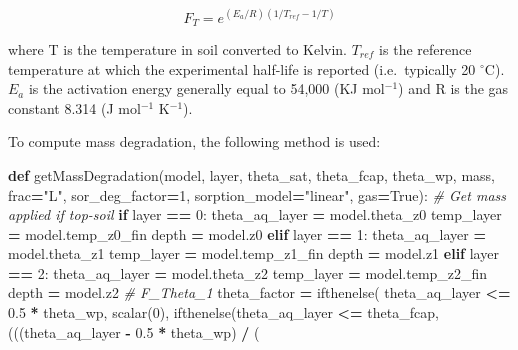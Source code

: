 \documentclass[]{article}
\newenvironment{Shaded}{\begin{snugshade}}{\end{snugshade}}
\newcommand{\KeywordTok}[1]{\textcolor[rgb]{0.13,0.29,0.53}{\textbf{#1}}}
\newcommand{\DecValTok}[1]{\textcolor[rgb]{0.00,0.00,0.81}{#1}}
\newcommand{\FloatTok}[1]{\textcolor[rgb]{0.00,0.00,0.81}{#1}}
\newcommand{\StringTok}[1]{\textcolor[rgb]{0.31,0.60,0.02}{#1}}
\newcommand{\CommentTok}[1]{\textcolor[rgb]{0.56,0.35,0.01}{\textit{#1}}}
\newcommand{\VariableTok}[1]{\textcolor[rgb]{0.00,0.00,0.00}{#1}}
\newcommand{\ControlFlowTok}[1]{\textcolor[rgb]{0.13,0.29,0.53}{\textbf{#1}}}
\newcommand{\OperatorTok}[1]{\textcolor[rgb]{0.81,0.36,0.00}{\textbf{#1}}}
\newcommand{\NormalTok}[1]{#1}
\begin{document}
\begin{equation} 
F_T = e^{(E_a/R)(1/T_{ref} - 1/T)}
\end{equation}

where T is the temperature in soil converted to Kelvin. \(T_{ref}\) is
the reference temperature at which the experimental half-life is
reported (i.e.~typically 20 \(^{\circ}\)C). \(E_a\) is the activation
energy generally equal to 54,000 (KJ mol\(^{-1}\)) and R is the gas
constant 8.314 (J mol\(^{-1}\) K\(^{-1}\)).

To compute mass degradation, the following method is used:

\begin{Shaded}
\begin{Highlighting}[]
\KeywordTok{def}\NormalTok{ getMassDegradation(model, layer,}
\NormalTok{                       theta_sat, theta_fcap, theta_wp,}
\NormalTok{                       mass, frac}\OperatorTok{=}\StringTok{"L"}\NormalTok{, sor_deg_factor}\OperatorTok{=}\DecValTok{1}\NormalTok{,}
\NormalTok{                       sorption_model}\OperatorTok{=}\StringTok{"linear"}\NormalTok{, gas}\OperatorTok{=}\VariableTok{True}\NormalTok{):}
    \CommentTok{# Get mass applied if top-soil}
    \ControlFlowTok{if}\NormalTok{ layer }\OperatorTok{==} \DecValTok{0}\NormalTok{:}
\NormalTok{        theta_aq_layer }\OperatorTok{=}\NormalTok{ model.theta_z0}
\NormalTok{        temp_layer }\OperatorTok{=}\NormalTok{ model.temp_z0_fin}
\NormalTok{        depth }\OperatorTok{=}\NormalTok{ model.z0}
    \ControlFlowTok{elif}\NormalTok{ layer }\OperatorTok{==} \DecValTok{1}\NormalTok{:}
\NormalTok{        theta_aq_layer }\OperatorTok{=}\NormalTok{ model.theta_z1}
\NormalTok{        temp_layer }\OperatorTok{=}\NormalTok{ model.temp_z1_fin}
\NormalTok{        depth }\OperatorTok{=}\NormalTok{ model.z1}
    \ControlFlowTok{elif}\NormalTok{ layer }\OperatorTok{==} \DecValTok{2}\NormalTok{:}
\NormalTok{        theta_aq_layer }\OperatorTok{=}\NormalTok{ model.theta_z2}
\NormalTok{        temp_layer }\OperatorTok{=}\NormalTok{ model.temp_z2_fin}
\NormalTok{        depth }\OperatorTok{=}\NormalTok{ model.z2}
    \CommentTok{# F_Theta_1}
\NormalTok{    theta_factor }\OperatorTok{=}\NormalTok{ ifthenelse(}
\NormalTok{        theta_aq_layer }\OperatorTok{<=} \FloatTok{0.5} \OperatorTok{*}\NormalTok{ theta_wp, scalar(}\DecValTok{0}\NormalTok{),}
\NormalTok{        ifthenelse(theta_aq_layer }\OperatorTok{<=}\NormalTok{ theta_fcap,}
\NormalTok{                   (((theta_aq_layer }\OperatorTok{-} \FloatTok{0.5} \OperatorTok{*}\NormalTok{ theta_wp) }\OperatorTok{/}\NormalTok{ (}

\end{Highlighting}
\end{Shaded}
\end{document}
